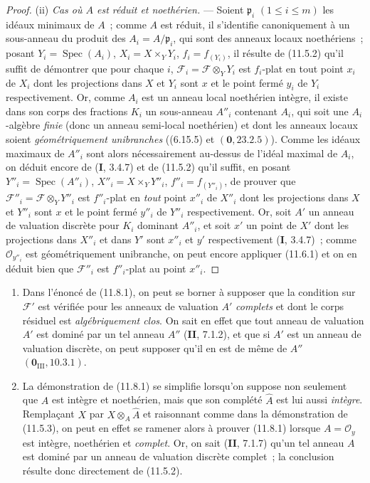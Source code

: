 \begin{proof}
\medskip
\noindent(ii) \emph{Cas où $A$ est réduit et noethérien.} --- Soient
$\mathfrak p_i$ $(1\leq i\leq m)$ les idéaux minimaux de $A$~; comme $A$ est
réduit, il s'identifie canoniquement à un sous-anneau du produit des
$A_i=A/\mathfrak p_i$, qui sont des anneaux locaux noethériens~; posant
$Y_i=\operatorname{Spec}(A_i)$, $X_i=X\times_Y Y_i$, $f_i=f_{(Y_i)}$, il
résulte de (11.5.2) qu'il suffit de démontrer que pour chaque $i$,
$\mathcal F_i=\mathcal F\otimes_Y Y_i$ est $f_i$-plat en tout point $x_i$ de
$X_i$ dont les projections dans $X$ et $Y_i$ sont $x$ et le point fermé $y_i$
de $Y_i$ respectivement. Or, comme $A_i$ est un anneau local noethérien intègre,
il existe dans son corps des fractions $K_i$ un sous-anneau $A''_i$ contenant
$A_i$, qui soit une $A_i$-algèbre \emph{finie} (donc un anneau semi-local
noethérien) et dont les anneaux locaux soient \emph{géométriquement
unibranches} ((6.15.5) et $(\mathbf 0,23.2.5)$). Comme les idéaux maximaux de
$A''_i$ sont alors nécessairement au-dessus de l'idéal maximal de $A_i$, on
déduit encore de (\textbf I, 3.4.7) et de (11.5.2) qu'il suffit, en posant
$Y''_i=\operatorname{Spec}(A''_i)$, $X''_i=X\times_Y Y''_i$,
$f''_i=f_{(Y''_i)}$, de prouver que
$\mathcal F''_i=\mathcal F\otimes_Y Y''_i$ est $f''_i$-plat en \emph{tout} point
$x''_i$ de $X''_i$ dont les projections dans $X$ et $Y''_i$ sont $x$ et le
point fermé $y''_i$ de $Y''_i$ respectivement. Or, soit $A'$ un anneau de
valuation discrète pour $K_i$ dominant $A''_i$, et soit $x'$ un point de $X'$
dont les projections dans $X''_i$ et dans $Y'$ sont $x''_i$ et $y'$
respectivement (\textbf I, 3.4.7)~; comme $\mathcal O_{y''_i}$ est
géométriquement unibranche, on peut encore appliquer (11.6.1) et on en déduit
bien que $\mathcal F''_i$ est $f''_i$-plat au point $x''_i$.
\end{proof}

\begin{remarks}[11.8.2]
\label{IV.11.8.2-fr}
\begin{enumerate}[label=(\roman*)]
  \item Dans l'énoncé de (11.8.1), on peut se borner à supposer que la condition
  sur $\mathcal F'$ est vérifiée pour les anneaux de valuation $A'$ \emph{complets}
  et dont le corps résiduel est \emph{algébriquement clos}. On sait en effet que
  tout anneau de valuation $A'$ est dominé par un tel anneau $A''$
  (\textbf{II}, 7.1.2), et que si $A'$ est un anneau de valuation discrète, on
  peut supposer qu'il en est de même de $A''$
  $(\mathbf 0_{\mathrm{III}},10.3.1)$.
  \item La démonstration de (11.8.1) se simplifie lorsqu'on suppose non seulement
  que $A$ est intègre et noethérien, mais que son complété $\widehat A$ est lui
  aussi \emph{intègre}. Remplaçant $X$ par $X\otimes_A\widehat A$ et raisonnant
  comme dans la démonstration de (11.5.3), on peut en effet se ramener alors à
  prouver (11.8.1) lorsque $A=\mathcal O_y$ est intègre, noethérien et
  \emph{complet}. Or, on sait (\textbf{II}, 7.1.7) qu'un tel anneau $A$ est
  dominé par un anneau de valuation discrète complet~; la conclusion résulte
  donc directement de (11.5.2).
\end{enumerate}
\end{remarks}

